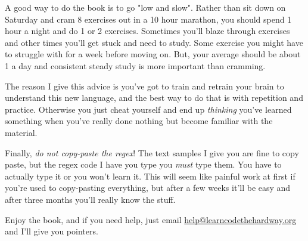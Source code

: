 A good way to do the book is to go "low and slow".  Rather than
sit down on Saturday and cram 8 exercises out in a 10 hour marathon,
you should spend 1 hour a night and do 1 or 2 exercises.  Sometimes
you'll blaze through exercises and other times you'll get stuck and
need to study.  Some exercise you might have to struggle with for
a week before moving on.  But, your average should be about 1 a day
and consistent steady study is more important than cramming.

The reason I give this advice is you've got to train and retrain
your brain to understand this new language, and the best way to
do that is with repetition and practice.  Otherwise you just cheat
yourself and end up \emph{thinking} you've learned something when
you've really done nothing but become familiar with the material.

Finally, \emph{do not copy-paste the regex}!  The text samples I give you
are fine to copy paste, but the regex code I have you type you \emph{must}
type them.  You have to actually type it or you won't learn it.  This will
seem like painful work at first if you're used to copy-pasting everything,
but after a few weeks it'll be easy and after three months you'll really
know the stuff.

Enjoy the book, and if you need help, just email \href{mailto:help@learncodethehardway.org}{help@learncodethehardway.org}
and I'll give you pointers.

